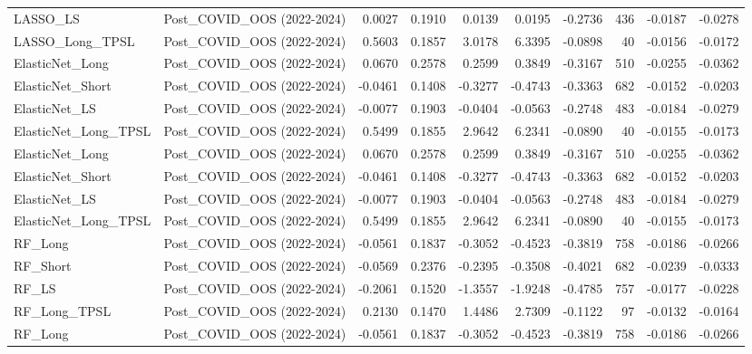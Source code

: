 \begin{tabular}{llrrrrrrrr}
LASSO\_LS & Post\_COVID\_OOS (2022-2024) & 0.0027 & 0.1910 & 0.0139 & 0.0195 & -0.2736 & 436 & -0.0187 & -0.0278 \\
\cline{1-10}
LASSO\_Long\_TPSL & Post\_COVID\_OOS (2022-2024) & 0.5603 & 0.1857 & 3.0178 & 6.3395 & -0.0898 & 40 & -0.0156 & -0.0172 \\
\cline{1-10}
ElasticNet\_Long & Post\_COVID\_OOS (2022-2024) & 0.0670 & 0.2578 & 0.2599 & 0.3849 & -0.3167 & 510 & -0.0255 & -0.0362 \\
\cline{1-10}
ElasticNet\_Short & Post\_COVID\_OOS (2022-2024) & -0.0461 & 0.1408 & -0.3277 & -0.4743 & -0.3363 & 682 & -0.0152 & -0.0203 \\
\cline{1-10}
ElasticNet\_LS & Post\_COVID\_OOS (2022-2024) & -0.0077 & 0.1903 & -0.0404 & -0.0563 & -0.2748 & 483 & -0.0184 & -0.0279 \\
\cline{1-10}
ElasticNet\_Long\_TPSL & Post\_COVID\_OOS (2022-2024) & 0.5499 & 0.1855 & 2.9642 & 6.2341 & -0.0890 & 40 & -0.0155 & -0.0173 \\
\cline{1-10}
ElasticNet\_Long & Post\_COVID\_OOS (2022-2024) & 0.0670 & 0.2578 & 0.2599 & 0.3849 & -0.3167 & 510 & -0.0255 & -0.0362 \\
\cline{1-10}
ElasticNet\_Short & Post\_COVID\_OOS (2022-2024) & -0.0461 & 0.1408 & -0.3277 & -0.4743 & -0.3363 & 682 & -0.0152 & -0.0203 \\
\cline{1-10}
ElasticNet\_LS & Post\_COVID\_OOS (2022-2024) & -0.0077 & 0.1903 & -0.0404 & -0.0563 & -0.2748 & 483 & -0.0184 & -0.0279 \\
\cline{1-10}
ElasticNet\_Long\_TPSL & Post\_COVID\_OOS (2022-2024) & 0.5499 & 0.1855 & 2.9642 & 6.2341 & -0.0890 & 40 & -0.0155 & -0.0173 \\
\cline{1-10}
RF\_Long & Post\_COVID\_OOS (2022-2024) & -0.0561 & 0.1837 & -0.3052 & -0.4523 & -0.3819 & 758 & -0.0186 & -0.0266 \\
\cline{1-10}
RF\_Short & Post\_COVID\_OOS (2022-2024) & -0.0569 & 0.2376 & -0.2395 & -0.3508 & -0.4021 & 682 & -0.0239 & -0.0333 \\
\cline{1-10}
RF\_LS & Post\_COVID\_OOS (2022-2024) & -0.2061 & 0.1520 & -1.3557 & -1.9248 & -0.4785 & 757 & -0.0177 & -0.0228 \\
\cline{1-10}
RF\_Long\_TPSL & Post\_COVID\_OOS (2022-2024) & 0.2130 & 0.1470 & 1.4486 & 2.7309 & -0.1122 & 97 & -0.0132 & -0.0164 \\
\cline{1-10}
RF\_Long & Post\_COVID\_OOS (2022-2024) & -0.0561 & 0.1837 & -0.3052 & -0.4523 & -0.3819 & 758 & -0.0186 & -0.0266 \\

\end{tabular}
